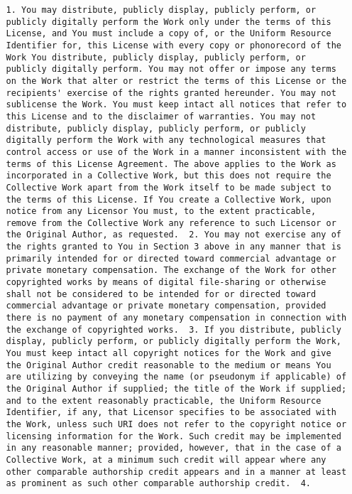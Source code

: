 \begin{lstlisting}
   1. You may distribute, publicly display, publicly perform, or
   publicly digitally perform the Work only under the terms of this
   License, and You must include a copy of, or the Uniform Resource
   Identifier for, this License with every copy or phonorecord of the
   Work You distribute, publicly display, publicly perform, or
   publicly digitally perform. You may not offer or impose any terms
   on the Work that alter or restrict the terms of this License or the
   recipients' exercise of the rights granted hereunder. You may not
   sublicense the Work. You must keep intact all notices that refer to
   this License and to the disclaimer of warranties. You may not
   distribute, publicly display, publicly perform, or publicly
   digitally perform the Work with any technological measures that
   control access or use of the Work in a manner inconsistent with the
   terms of this License Agreement. The above applies to the Work as
   incorporated in a Collective Work, but this does not require the
   Collective Work apart from the Work itself to be made subject to
   the terms of this License. If You create a Collective Work, upon
   notice from any Licensor You must, to the extent practicable,
   remove from the Collective Work any reference to such Licensor or
   the Original Author, as requested.  2. You may not exercise any of
   the rights granted to You in Section 3 above in any manner that is
   primarily intended for or directed toward commercial advantage or
   private monetary compensation. The exchange of the Work for other
   copyrighted works by means of digital file-sharing or otherwise
   shall not be considered to be intended for or directed toward
   commercial advantage or private monetary compensation, provided
   there is no payment of any monetary compensation in connection with
   the exchange of copyrighted works.  3. If you distribute, publicly
   display, publicly perform, or publicly digitally perform the Work,
   You must keep intact all copyright notices for the Work and give
   the Original Author credit reasonable to the medium or means You
   are utilizing by conveying the name (or pseudonym if applicable) of
   the Original Author if supplied; the title of the Work if supplied;
   and to the extent reasonably practicable, the Uniform Resource
   Identifier, if any, that Licensor specifies to be associated with
   the Work, unless such URI does not refer to the copyright notice or
   licensing information for the Work. Such credit may be implemented
   in any reasonable manner; provided, however, that in the case of a
   Collective Work, at a minimum such credit will appear where any
   other comparable authorship credit appears and in a manner at least
   as prominent as such other comparable authorship credit.  4.


\end{lstlisting}
